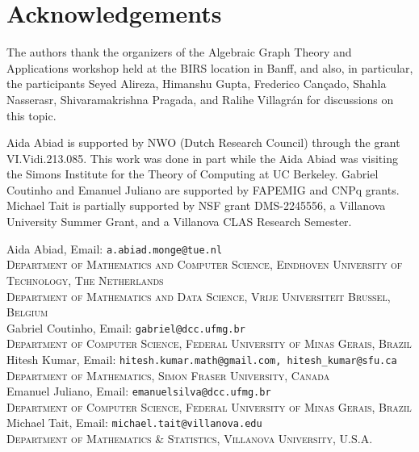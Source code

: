 \documentclass[11pt]{article}
\theoremstyle{plain}
\numberwithin{equation}{section}
\newcommand{\affl}[3]{\noindent #1, Email: {\tt #2}\\ \textsc{#3}\\[1.5pt]}
\begin{document}
\section*{Acknowledgements}
The authors thank the organizers of the Algebraic Graph Theory and Applications workshop held at the BIRS location in Banff, and also, in particular, the participants Seyed Alireza,  Himanshu Gupta, Frederico Cançado, Shahla Nasserasr, Shivaramakrishna Pragada, and Ralihe Villagr\'an for discussions on this topic.


Aida Abiad is supported by NWO (Dutch Research Council) through the grant VI.Vidi.213.085. This work was done in part while the Aida Abiad was visiting the Simons Institute for the Theory of Computing at UC Berkeley. Gabriel Coutinho and Emanuel Juliano are supported by FAPEMIG and CNPq grants. Michael Tait is partially supported by NSF grant DMS-2245556, a Villanova University Summer Grant, and a Villanova CLAS Research Semester. 



\affl{Aida Abiad}{a.abiad.monge@tue.nl}{Department of Mathematics and Computer Science, Eindhoven University of Technology, The Netherlands \\ Department of Mathematics and Data Science, Vrije Universiteit Brussel, Belgium}

\affl{Gabriel Coutinho}{gabriel@dcc.ufmg.br}{Department of Computer Science, Federal University of Minas Gerais, Brazil}

\affl{Hitesh Kumar}{hitesh.kumar.math@gmail.com, hitesh\_kumar@sfu.ca}{Department of Mathematics, Simon Fraser University, Canada}

\affl{Emanuel Juliano}{emanuelsilva@dcc.ufmg.br}{Department of Computer Science, Federal University of Minas Gerais, Brazil}

\affl{Michael Tait}{michael.tait@villanova.edu}{Department of Mathematics \& Statistics, Villanova University, U.S.A.}
\end{document}
